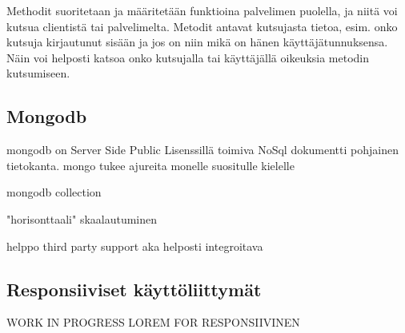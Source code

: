 \documentclass[11pt,a4paper,titlepage,oneside]{article}
\begin{document}
\medskip


Methodit suoritetaan ja määritetään funktioina palvelimen puolella, ja niitä voi kutsua clientistä tai palvelimelta.
Metodit antavat kutsujasta tietoa, esim. onko kutsuja kirjautunut sisään ja jos on niin mikä on hänen käyttäjätunnuksensa. 
Näin voi helposti katsoa onko kutsujalla tai käyttäjällä oikeuksia metodin kutsumiseen.








\newpage












\newpage
\subsection{Mongodb}





mongodb on Server Side Public Lisenssillä toimiva NoSql dokumentti pohjainen tietokanta.%
mongo tukee ajureita monelle suositulle kielelle

mongodb collection

"horisonttaali" skaalautuminen

helppo third party support
aka helposti integroitava





\subsection{Responsiiviset käyttöliittymät}


WORK IN PROGRESS LOREM FOR RESPONSIIVINEN
\medskip
\end{document}
